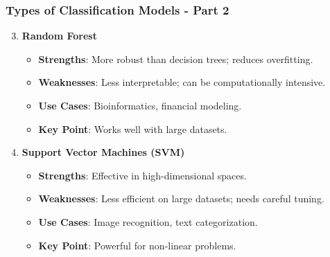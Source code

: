 \documentclass[aspectratio=169]{beamer}
\begin{document}
\begin{frame}[fragile]
    \frametitle{Types of Classification Models - Part 2}
    \begin{enumerate}
        \setcounter{enumi}{2} %
        \item \textbf{Random Forest}
            \begin{itemize}
                \item \textbf{Strengths}: More robust than decision trees; reduces overfitting.
                \item \textbf{Weaknesses}: Less interpretable; can be computationally intensive.
                \item \textbf{Use Cases}: Bioinformatics, financial modeling.
                \item \textbf{Key Point}: Works well with large datasets.
            \end{itemize}

        \item \textbf{Support Vector Machines (SVM)}
            \begin{itemize}
                \item \textbf{Strengths}: Effective in high-dimensional spaces.
                \item \textbf{Weaknesses}: Less efficient on large datasets; needs careful tuning.
                \item \textbf{Use Cases}: Image recognition, text categorization.
                \item \textbf{Key Point}: Powerful for non-linear problems.
            \end{itemize}
    \end{enumerate}
\end{frame}
\end{document}
